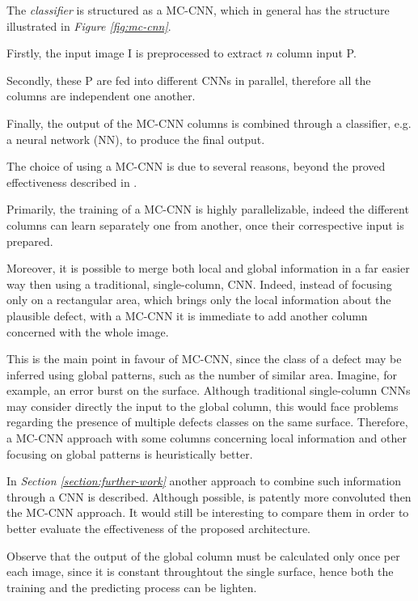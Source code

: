     \par{
        The \emph{classifier} is structured as a MC-CNN, which in general has the structure illustrated in \emph{Figure \ref{fig:mc-cnn}}. 
    }
    \par{
        Firstly, the input image I is preprocessed to extract $n$ column input P.
    }
    \par{
        Secondly, these P are fed into different CNNs in parallel, therefore all the columns are independent one another. 
    }
    \par{
        Finally, the output of the MC-CNN columns is combined through a classifier, e.g. a neural network (NN), to produce the final output.
    }
    \par{
        The choice of using a MC-CNN is due to several reasons, beyond the proved effectiveness described in \cite{ieee:6248110}.
    }
    \par{
        Primarily, the training of a MC-CNN is highly parallelizable, indeed the different columns can learn separately one from another, once their correspective input is prepared.
    }
    \par{
        Moreover, it is possible to merge both local and global information in a far easier way then using a traditional, single-column, CNN. Indeed, instead of focusing only on a rectangular area, which brings only the local information about the plausible defect, with a MC-CNN it is immediate to add another column concerned with the whole image.
    }
    \par{
        This is the main point in favour of MC-CNN, since the class of a defect may be inferred using global patterns, such as the number of similar area. Imagine, for example, an error burst on the surface. Although traditional single-column CNNs may consider directly the input to the global column, this would face problems regarding the presence of multiple defects classes on the same surface. Therefore, a MC-CNN approach with some columns concerning local information and other focusing on global patterns is heuristically better.
    }
    \par{
        In \emph{Section \ref{section:further-work}} another approach to combine such information through a CNN is described. Although possible, is patently more convoluted then the MC-CNN approach. It would still be interesting to compare them in order to better evaluate the effectiveness of the proposed architecture. 
    }
    \par{
        Observe that the output of the global column must be calculated only once per each image, since it is constant throughtout the single surface, hence both the training and the predicting process can be lighten.
    }
